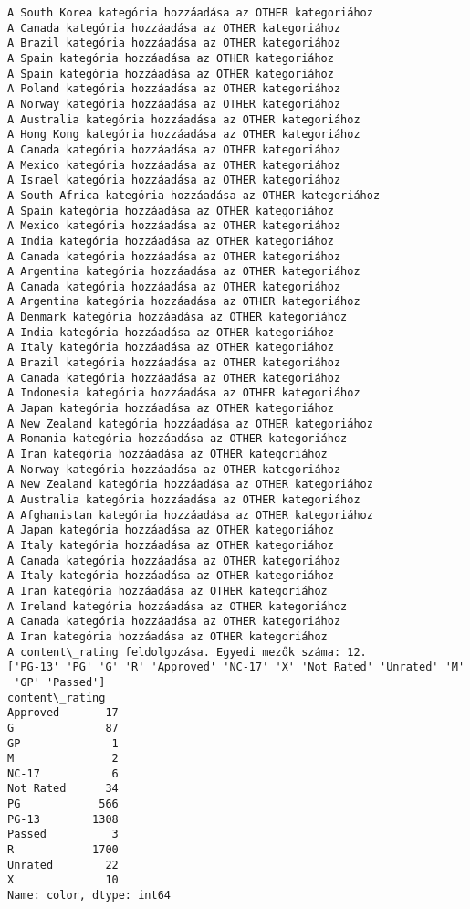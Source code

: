 \documentclass[11pt]{article}
\begin{document}
\begin{Verbatim}[commandchars=\\\{\}]
A South Korea kategória hozzáadása az OTHER kategoriához
A Canada kategória hozzáadása az OTHER kategoriához
A Brazil kategória hozzáadása az OTHER kategoriához
A Spain kategória hozzáadása az OTHER kategoriához
A Spain kategória hozzáadása az OTHER kategoriához
A Poland kategória hozzáadása az OTHER kategoriához
A Norway kategória hozzáadása az OTHER kategoriához
A Australia kategória hozzáadása az OTHER kategoriához
A Hong Kong kategória hozzáadása az OTHER kategoriához
A Canada kategória hozzáadása az OTHER kategoriához
A Mexico kategória hozzáadása az OTHER kategoriához
A Israel kategória hozzáadása az OTHER kategoriához
A South Africa kategória hozzáadása az OTHER kategoriához
A Spain kategória hozzáadása az OTHER kategoriához
A Mexico kategória hozzáadása az OTHER kategoriához
A India kategória hozzáadása az OTHER kategoriához
A Canada kategória hozzáadása az OTHER kategoriához
A Argentina kategória hozzáadása az OTHER kategoriához
A Canada kategória hozzáadása az OTHER kategoriához
A Argentina kategória hozzáadása az OTHER kategoriához
A Denmark kategória hozzáadása az OTHER kategoriához
A India kategória hozzáadása az OTHER kategoriához
A Italy kategória hozzáadása az OTHER kategoriához
A Brazil kategória hozzáadása az OTHER kategoriához
A Canada kategória hozzáadása az OTHER kategoriához
A Indonesia kategória hozzáadása az OTHER kategoriához
A Japan kategória hozzáadása az OTHER kategoriához
A New Zealand kategória hozzáadása az OTHER kategoriához
A Romania kategória hozzáadása az OTHER kategoriához
A Iran kategória hozzáadása az OTHER kategoriához
A Norway kategória hozzáadása az OTHER kategoriához
A New Zealand kategória hozzáadása az OTHER kategoriához
A Australia kategória hozzáadása az OTHER kategoriához
A Afghanistan kategória hozzáadása az OTHER kategoriához
A Japan kategória hozzáadása az OTHER kategoriához
A Italy kategória hozzáadása az OTHER kategoriához
A Canada kategória hozzáadása az OTHER kategoriához
A Italy kategória hozzáadása az OTHER kategoriához
A Iran kategória hozzáadása az OTHER kategoriához
A Ireland kategória hozzáadása az OTHER kategoriához
A Canada kategória hozzáadása az OTHER kategoriához
A Iran kategória hozzáadása az OTHER kategoriához
A content\_rating feldolgozása. Egyedi mezők száma: 12.
['PG-13' 'PG' 'G' 'R' 'Approved' 'NC-17' 'X' 'Not Rated' 'Unrated' 'M'
 'GP' 'Passed']
content\_rating
Approved       17
G              87
GP              1
M               2
NC-17           6
Not Rated      34
PG            566
PG-13        1308
Passed          3
R            1700
Unrated        22
X              10
Name: color, dtype: int64

\end{Verbatim}
\end{document}

